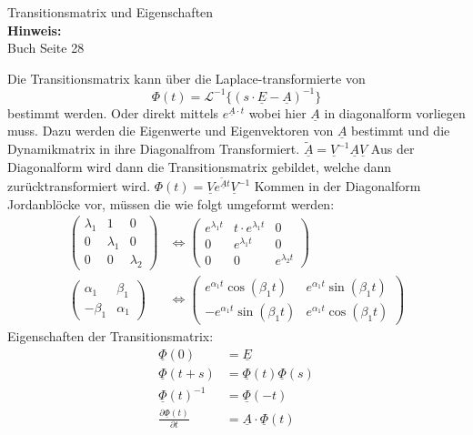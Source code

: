 \begin{question}[section=2,name={Transitionsmatrix},difficulty=3,type=mdl,tags={}]
	Transitionsmatrix und Eigenschaften
	\\ \textbf{Hinweis:}\\
	Buch Seite 28
\end{question}
\begin{solution}
	Die Transitionsmatrix kann über die Laplace-transformierte von
	\begin{equation}
		\Phi(t)=\mathscr L^{-1}\{ (s\cdot \underline E - \underline A)^{-1}\}
	\end{equation}
	bestimmt werden. Oder direkt mittels $e^{\underline A \cdot t}$ wobei hier $\underline A$ in diagonalform vorliegen muss.
	Dazu werden die Eigenwerte und Eigenvektoren von $\underline A$ bestimmt und die Dynamikmatrix in ihre Diagonalfrom Transformiert. $\tilde{\underline{A}}=\underline V ^{-1} \underline{A} \underline{V}$ Aus der Diagonalform wird dann die Transitionsmatrix gebildet, welche dann zurücktransformiert wird. $\Phi (t) = \underline{V} e^{\tilde{\underline{A}}t} \underline V ^{-1}$
	Kommen in der Diagonalform Jordanblöcke vor, müssen die wie folgt umgeformt werden:
	\begin{align}
		\left ( \begin{array}{ccc} \lambda_1 & 1 & 0 \\0 & \lambda_1 & 0\\ 0 & 0 & \lambda_2 \end{array} \right ) &\Leftrightarrow \left ( \begin{array}{ccc} e^{\lambda_1 t} & t\cdot e^{\lambda_1 t} & 0 \\0 & e^{\lambda_1 t} & 0\\ 0 & 0 & e^{\lambda_2 t} \end{array} \right )\\
		\left ( \begin{array}{cc} \alpha_1 & \beta_1  \\-\beta_1 & \alpha_1 \end{array} \right ) &\Leftrightarrow \left ( \begin{array}{cc} e^{\alpha_1 t} \cos(\beta_1 t) &  e^{\alpha_1 t}\sin(\beta_1 t)  \\ -e^{\alpha_1 t}\sin(\beta_1 t)& e^{\alpha_1 t} \cos(\beta_1 t)   \end{array} \right )
	\end{align}
	Eigenschaften der Transitionsmatrix:
	\begin{align}
		\underline{\Phi}(0) &= \underline E\\
		\underline{\Phi}(t+s) &= \underline{\Phi}(t)\underline{\Phi}(s)\\
		\underline{\Phi}(t)^{-1} &=\underline{\Phi}(-t)\\
		\frac{\partial \underline{\Phi}(t)}{\partial t} &= \underline A \cdot \underline{\Phi}(t)
	\end{align}
\end{solution}